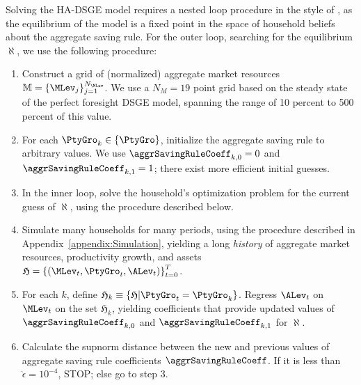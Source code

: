 Solving the HA-DSGE model requires a nested loop procedure in the style of \cite{ksHetero},
as the equilibrium of the model is a fixed point in the space of household beliefs about the
aggregate saving rule. For the outer loop, searching for the equilibrium $\aleph$, we use the following procedure:
\begin{enumerate}
\item Construct a grid of (normalized) aggregate market resources $\mathbb{M} = \{\MLev_j \}_{j=1}^{N_\MLev}$.
We use a $N_M = 19$ point grid based on the steady state of the perfect foresight DSGE model, spanning the range of 10 percent to 500 percent of this value.

\item For each $\PtyGro_k \in \{\PtyGro\}$, initialize the aggregate saving rule to arbitrary values.
We use $\aggrSavingRuleCoeff_{k,0} = 0$ and $\aggrSavingRuleCoeff_{k,1} = 1$; there exist more efficient initial guesses.

\item In the inner loop, solve the household's optimization problem for the current guess of $\aleph$,
using the procedure described below.

\item Simulate many households for many periods, using the procedure described in
Appendix~\ref{appendix:Simulation}, yielding a long \textit{history} of aggregate
market resources, productivity growth, and assets $\mathfrak{H} = \left\{(\MLev_t,\PtyGro_t,\ALev_t)\right\}_{t=0}^T$.

\item For each $k$, define $\mathfrak{H}_k \equiv \left\{ \mathfrak{H} | \PtyGro_t = \PtyGro_k \right\}$.
Regress $\ALev_t$ on $\MLev_t$ on the set $\mathfrak{H}_k$, yielding coefficients
that provide updated values of $\aggrSavingRuleCoeff_{k,0}$ and $\aggrSavingRuleCoeff_{k,1}$ for $\aleph$.

\item Calculate the supnorm distance between the new and previous values of aggregate
saving rule coefficients $\aggrSavingRuleCoeff$.  If it is less than $\grave{\epsilon} = 10^{-4}$, STOP;
else go to step 3.
\end{enumerate}

